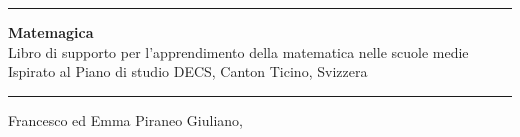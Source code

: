 \documentclass[
  a4paper,
  12pt,
  twoside,
  openright
]{book}
\begin{document}

\begin{titlepage}
  \centering
  \vspace*{3cm}

  {\color{blu}\rule{\linewidth}{1.5pt}}
  \vspace{0.6cm}

  {\Huge\bfseries\color{blu} Matemagica}\\[0.4cm]
  {\color{black}Libro di supporto per l'apprendimento della matematica nelle scuole medie}\\[0.2cm]
  {\small\color{darkgray} Ispirato al Piano di studio DECS, Canton Ticino, Svizzera}

  \vspace{0.6cm}
  {\color{blu}\rule{\linewidth}{1.5pt}}

  \vfill

  \vspace{2cm}
  {\small\color{black}Francesco ed Emma Piraneo Giuliano, \the\year}
\end{titlepage}

\frontmatter
\tableofcontents
\clearpage

\mainmatter
















\end{document}
